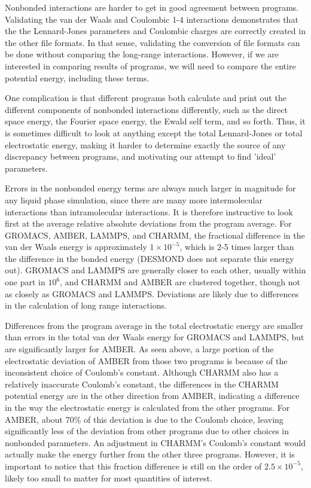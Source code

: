 Nonbonded interactions are harder to get in good agreement between
programs.  Validating the van der Waals and Coulombic 1-4 interactions
demonstrates that the the Lennard-Jones parameters and Coulombic
charges are correctly created in the other file formats.  In that
sense, validating the conversion of file formats can be done without
comparing the long-range interactions. However, if we are interested
in comparing results of programs, we will need to compare the entire
potential energy, including these terms.

One complication is that different programs both calculate and print
out the different components of nonbonded interactions differently,
such as the direct space energy, the Fourier space energy, the Ewald
self term, and so forth.  Thus, it is sometimes difficult to look at
anything except the total Lennard-Jones or total electrostatic energy,
making it harder to determine exactly the source of any discrepancy
between programs, and motivating our attempt to find 'ideal'
parameters. 

Errors in the nonbonded energy terms are always much larger in
magnitude for any liquid phase simulation, since there are many more
intermolecular interactions than intramolecular interactions.  It is
therefore instructive to look first at the average relative absolute
deviations from the program average. For GROMACS, AMBER, LAMMPS, and
CHARMM, the fractional difference in the van der Waals energy is
approximately $1\times 10^{-5}$, which is 2-5 times larger than the
difference in the bonded energy (DESMOND does not separate this energy
out). GROMACS and LAMMPS are generally closer to each other, usually
within one part in $10^6$, and CHARMM and AMBER are clustered
together, though not as closely as GROMACS and LAMMPS. Deviations are
likely due to differences in the calculation of long range
interactions.

Differences from the program average in the total electrostatic energy
are smaller than errors in the total van der Waals energy for GROMACS
and LAMMPS, but are significantly larger for AMBER.  As seen above, a
large portion of the electrostatic deviation of AMBER from those two
programs is because of the inconsistent choice of Coulomb's constant.
Although CHARMM also has a relatively inaccurate Coulomb's constant,
the differences in the CHARMM potential energy are in the other
direction from AMBER, indicating a difference in the way the
electrostatic energy is calculated from the other programs.  For
AMBER, about 70\% of this deviation is due to the Coulomb choice,
leaving significantly less of the deviation from other programs due to
other choices in nonbonded parameters. An adjustment in CHARMM's
Coulomb's constant would actually make the energy further from the
other three programs.  However, it is important to notice that this
fraction difference is still on the order of $2.5 \times 10^{-5}$,
likely too small to matter for most quantities of interest.


